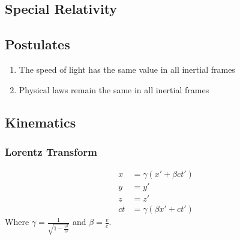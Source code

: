 \documentclass[11pt]{article}
\begin{document}
\begin{multicols*}{3}
\section{Special Relativity}
\subsection{Postulates}
\begin{enumerate}
\item The speed of light has the same value in all inertial frames
\item Physical laws remain the same in all inertial frames
\end{enumerate}
\subsection{Kinematics}
\subsubsection{Lorentz Transform}
\begin{align*}
x&= \gamma (x' + \beta ct') \\
y&=y' \\
z&=z' \\
ct&= \gamma (\beta x' + ct')
\end{align*}
Where $\gamma = \frac{1}{\sqrt{1-\frac{v^2}{c^2}}}$ and $\beta = \frac{v}{c}$.

\end{multicols*}
\end{document}
